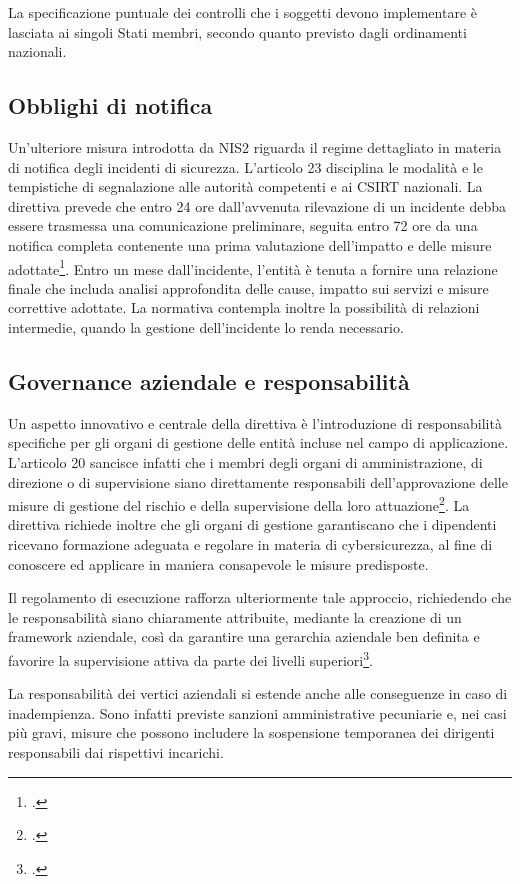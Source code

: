 La specificazione puntuale dei controlli che i soggetti devono implementare è lasciata ai singoli
Stati membri, secondo quanto previsto dagli ordinamenti nazionali.


\subsection{Obblighi di notifica}
Un'ulteriore misura introdotta da NIS2 riguarda il regime dettagliato in materia di 
notifica degli incidenti di sicurezza. L'articolo 23 disciplina le modalità e le tempistiche di 
segnalazione alle autorità competenti e ai CSIRT nazionali. La direttiva prevede che entro 
24 ore dall’avvenuta rilevazione di un incidente debba essere trasmessa una comunicazione preliminare, 
seguita entro 72 ore da una notifica completa contenente una prima valutazione 
dell’impatto e delle misure adottate\footcite[art. 23]{nis2-directive}. Entro un mese dall’incidente, l’entità 
è tenuta a fornire una relazione finale che includa analisi approfondita delle cause, impatto sui servizi 
e misure correttive adottate. La normativa contempla inoltre la possibilità di relazioni intermedie, 
quando la gestione dell’incidente lo renda necessario.


\subsection{Governance aziendale e responsabilità}
Un aspetto innovativo e centrale della direttiva è l’introduzione di responsabilità 
specifiche per gli organi di gestione delle entità incluse nel campo di applicazione. 
L’articolo 20 sancisce infatti che i membri degli organi di amministrazione, di direzione o di 
supervisione siano direttamente responsabili dell’approvazione delle misure di gestione del rischio 
e della supervisione della loro attuazione\footcite[art. 20]{nis2-directive}. 
La direttiva richiede inoltre che gli organi di gestione garantiscano che i dipendenti ricevano 
formazione adeguata e regolare in materia di cybersicurezza, al fine di conoscere ed applicare 
in maniera consapevole le misure predisposte. 

Il regolamento di esecuzione rafforza ulteriormente tale approccio, richiedendo
che le responsabilità siano chiaramente attribuite, mediante la creazione di un framework aziendale,
così da garantire una gerarchia aziendale ben definita e favorire la supervisione
attiva da parte dei livelli superiori\footcite[Allegato]{regolamento-2690}.

La responsabilità dei vertici aziendali si estende anche alle conseguenze in caso di inadempienza. 
Sono infatti previste sanzioni amministrative pecuniarie e, nei casi più gravi, 
misure che possono includere la sospensione temporanea dei dirigenti responsabili
dai rispettivi incarichi. 



